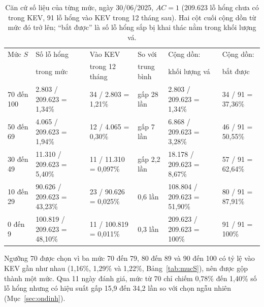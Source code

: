 \documentclass[conference]{IEEEtran}
\begin{document}
\begin{table}[t]
\centering
\caption{Căn cứ số liệu của từng mức, ngày 30/06/2025, $AC = 1$ (209.623 lỗ hổng chưa có trong KEV, 91 lỗ hổng vào KEV trong 12 tháng sau). Hai cột cuối cộng dồn từ mức đó trở lên; ``bắt được'' là số lỗ hổng sắp bị khai thác nằm trong khối lượng vá.}\label{tab:cancu}
\footnotesize
\setlength{\tabcolsep}{4pt}
\begin{tabular}{llllll}
\toprule
Mức $S$ & Số lỗ hổng & Vào KEV & So với & Cộng dồn: & Cộng dồn: \\
 & trong mức & trong 12 tháng & trung bình & khối lượng vá & bắt được \\
\midrule
70 đến 100 & 2.803 / 209.623 = 1,34\% & 34 / 2.803 = 1,21\% & gấp 28 lần & 2.803 / 209.623 = 1,34\% & 34 / 91 = 37,36\% \\
50 đến 69 & 4.065 / 209.623 = 1,94\% & 12 / 4.065 = 0,30\% & gấp 7 lần & 6.868 / 209.623 = 3,28\% & 46 / 91 = 50,55\% \\
30 đến 49 & 11.310 / 209.623 = 5,40\% & 11 / 11.310 = 0,097\% & gấp 2,2 lần & 18.178 / 209.623 = 8,67\% & 57 / 91 = 62,64\% \\
10 đến 29 & 90.626 / 209.623 = 43,23\% & 23 / 90.626 = 0,025\% & 0,6 lần & 108.804 / 209.623 = 51,90\% & 80 / 91 = 87,91\% \\
0 đến 9 & 100.819 / 209.623 = 48,10\% & 11 / 100.819 = 0,011\% & 0,3 lần & 209.623 / 209.623 = 100\% & 91 / 91 = 100\% \\
\bottomrule
\end{tabular}
\end{table}

Ngưỡng 70 được chọn vì ba mức 70 đến 79, 80 đến 89 và 90 đến 100 có tỷ lệ vào KEV gần như nhau (1,16\%, 1,29\% và
1,22\%, Bảng~\ref{tab:mucS}), nên được gộp thành một mức. Qua 11 ngày đánh giá, mức từ 70 chỉ chiếm 0,78\% đến
1,40\% số lỗ hổng nhưng có hiệu suất gấp 15,9 đến 34,2 lần so với chọn ngẫu nhiên (Mục~\ref{sec:ondinh}).
\end{document}
